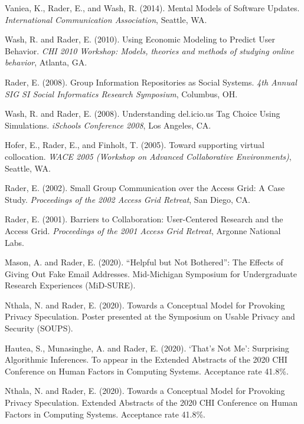 \documentclass[9pt]{extarticle}
\makeatletter
\renewcommand{\section}{%
  \@startsection{section}{1}{0em}{\baselineskip}{3pt}{\large\bfseries\textsc}}
\makeatother
\begin{document}
Vaniea, K., Rader, E., and Wash, R. (2014). Mental Models of Software Updates. \emph{International Communication Association},  Seattle, WA.

Wash, R. and Rader, E. (2010). Using Economic Modeling to Predict User Behavior. \emph{CHI 2010 Workshop: Models, theories and methods of studying online behavior}, Atlanta, GA.

Rader, E. (2008). Group Information Repositories as Social Systems. \emph{4th Annual SIG SI Social Informatics Research Symposium}, Columbus, OH.

Wash, R. and Rader, E. (2008). Understanding del.icio.us Tag Choice Using Simulations. \emph{iSchools Conference 2008}, Los Angeles, CA.

Hofer, E., Rader, E., and Finholt, T. (2005). Toward supporting virtual collocation. \emph{WACE 2005 (Workshop on Advanced Collaborative Environments)}, Seattle, WA.

Rader, E. (2002). Small Group Communication over the Access Grid: A Case Study. \emph{Proceedings of the 2002 Access Grid Retreat}, San Diego, CA.

Rader, E. (2001). Barriers to Collaboration: User-Centered Research and the Access Grid. \emph{Proceedings of the 2001 Access Grid Retreat}, Argonne National Labs.



\section{Extended Abstracts and Posters}

Mason, A. and Rader, E. (2020). ``Helpful but Not Bothered'': The Effects of Giving Out Fake Email Addresses. Mid-Michigan Symposium for Undergraduate Research Experiences (MiD-SURE).

Nthala, N. and Rader, E. (2020). Towards a Conceptual Model for Provoking Privacy Speculation. Poster presented at the Symposium on Usable Privacy and Security (SOUPS).

Hautea, S., Munasinghe, A. and Rader, E. (2020). `That's Not Me': Surprising Algorithmic Inferences. To appear in the Extended Abstracts of the 2020 CHI Conference on Human Factors in Computing Systems. Acceptance rate 41.8\%.

Nthala, N. and Rader, E. (2020). Towards a Conceptual Model for Provoking Privacy Speculation. Extended Abstracts of the 2020 CHI Conference on Human Factors in Computing Systems. Acceptance rate 41.8\%.
\end{document}
